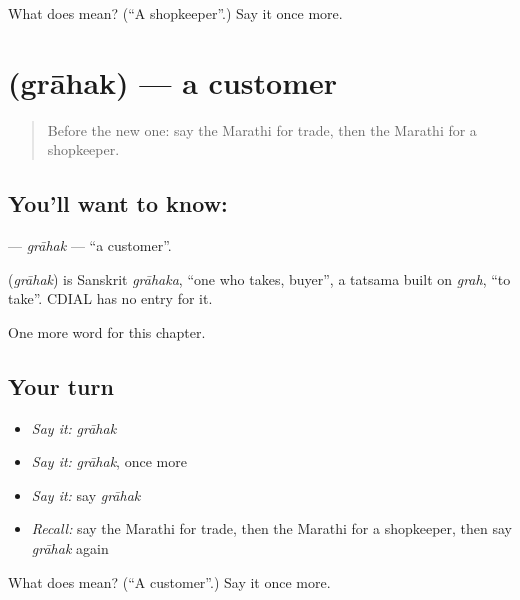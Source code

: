 \begin{tcolorbox}[breakable,colback=teal!4,colframe=teal!35!black,title={Before you move on}]
What does  mean? (\textquotedblleft{}A shopkeeper\textquotedblright{}.) Say it once more.
\end{tcolorbox}
\section[\texorpdfstring{\mr{ग्राहक} (grāhak)}{ग्राहक (grāhak)}]{ (grāhak) — a customer}

\label{lesson:MR-C219-grahak}



\begin{quote}
Before the new one: say the Marathi for trade, then the Marathi for a shopkeeper.
\end{quote}

\subsection*{You'll want to know: }
\textbf{} — \emph{grāhak} — \textquotedblleft{}a customer\textquotedblright{}.

\begin{cousinweb}
\textbf{} (\emph{grāhak}) is Sanskrit \emph{grāhaka}, \textquotedblleft{}one who takes, buyer\textquotedblright{}, a tatsama built on \emph{grah}, \textquotedblleft{}to take\textquotedblright{}. CDIAL has no entry for it.
\end{cousinweb}

\begin{grammarlens}[title={What you've built}]
One more word for this chapter.
\end{grammarlens}

\subsection*{Your turn}
\begin{itemize}
\raggedright
  \item \emph{Say it:} \emph{grāhak}
  \item \emph{Say it:} \emph{grāhak}, once more
  \item \emph{Say it:} say \emph{grāhak}
  \item \emph{Recall:} say the Marathi for trade, then the Marathi for a shopkeeper, then say \emph{grāhak} again
\end{itemize}

\begin{tcolorbox}[breakable,colback=teal!4,colframe=teal!35!black,title={Before you move on}]
What does  mean? (\textquotedblleft{}A customer\textquotedblright{}.) Say it once more.
\end{tcolorbox}
